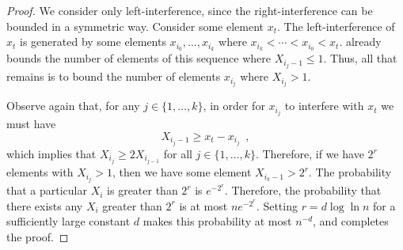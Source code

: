 \documentclass{patmorin}
\begin{document}
\begin{proof}
We consider only left-interference, since the right-interference
can be bounded in a symmetric way.  Consider some element $x_t$.  The
left-interference of $x_t$ is generated by some elements
$x_{i_0},\ldots,x_{i_k}$ where $x_{i_k}<\cdots<
x_{i_0}<x_t$.   already bounds the number of elements of this
sequence where $X_{i_j-1} \le 1$.  Thus, all that remains is to bound
the number of elements $x_{i_j}$ where $X_{i_j} > 1$.

Observe again that, for any $j\in\{1,\ldots,k\}$, in order for $x_{i_j}$
to interfere with $x_t$ we must have
\[
   X_{i_j-1} \ge x_t - x_{i_j} 
\enspace ,
\]
which implies that $X_{i_j} \ge 2 X_{i_{j-1}}$ for all
$j\in\{1,\ldots,k\}$.  Therefore, if we have $2^r$ elements with
$X_{i_j}>1$, then we have some element $X_{i_k-1} > 2^r$.  The probability
that a particular $X_i$ is greater than $2^r$ is $e^{-2^r}$. Therefore,
the probability that there exists any $X_i$ greater than $2^r$ is at most
$ne^{-2^r}$.  Setting $r=d\log\ln n$ for a sufficiently large constant
$d$ makes this probability at most $n^{-d}$, and completes the proof.
\end{proof}



\end{document}
